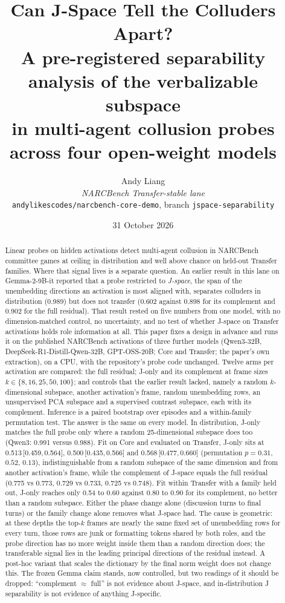 \documentclass[11pt,a4paper]{article}
\title{\textbf{Can J-Space Tell the Colluders Apart?}\\[0.3em]
\large A pre-registered separability analysis of the verbalizable subspace\\ in multi-agent collusion probes across four open-weight models}
\author{Andy Liang\\[0.4em]
{\normalsize\textit{NARCBench Transfer-stable lane}}\\[0.2em]
{\normalsize\texttt{andylikescodes/narcbench-core-demo}, branch \texttt{jspace-separability}}}
\date{31 October 2026}
\newcommand{\ci}[3]{#1\,[#2,\,#3]}
\begin{document}
\maketitle

\begin{abstract}
Linear probes on hidden activations detect multi-agent collusion in NARCBench committee games at ceiling in distribution and well above chance on held-out Transfer families. Where that signal lives is a separate question. An earlier result in this lane on Gemma-2-9B-it reported that a probe restricted to \emph{J-space}, the span of the unembedding directions an activation is most aligned with, separates colluders in distribution (0.989) but does not transfer (0.602 against 0.898 for its complement and 0.902 for the full residual). That result rested on five numbers from one model, with no dimension-matched control, no uncertainty, and no test of whether J-space on Transfer activations holds role information at all. This paper fixes a design in advance and runs it on the published NARCBench activations of three further models (Qwen3-32B, DeepSeek-R1-Distill-Qwen-32B, GPT-OSS-20B; Core and Transfer; the paper's own extraction), on a CPU, with the repository's probe code unchanged. Twelve arms per activation are compared: the full residual; J-only and its complement at frame sizes $k\in\{8,16,25,50,100\}$; and controls that the earlier result lacked, namely a random $k$-dimensional subspace, another activation's frame, random unembedding rows, an unsupervised PCA subspace and a supervised contrast subspace, each with its complement. Inference is a paired bootstrap over episodes and a within-family permutation test. The answer is the same on every model. In distribution, J-only matches the full probe only where a random 25-dimensional subspace does too (Qwen3: 0.991 versus 0.988). Fit on Core and evaluated on Transfer, J-only sits at \ci{0.513}{0.459}{0.564}, \ci{0.500}{0.435}{0.566} and \ci{0.568}{0.477}{0.660} (permutation $p=0.31$, $0.52$, $0.13$), indistinguishable from a random subspace of the same dimension and from another activation's frame, while the complement of J-space equals the full residual (0.775 vs 0.773, 0.729 vs 0.733, 0.725 vs 0.748). Fit within Transfer with a family held out, J-only reaches only 0.54 to 0.60 against 0.80 to 0.90 for its complement, no better than a random subspace. Either the phase change alone (discussion turns to final turns) or the family change alone removes what J-space had. The cause is geometric: at these depths the top-$k$ frames are nearly the same fixed set of unembedding rows for every turn, those rows are junk or formatting tokens shared by both roles, and the probe direction has no more weight inside them than a random direction does; the transferable signal lies in the leading principal directions of the residual instead. A post-hoc variant that scales the dictionary by the final norm weight does not change this. The frozen Gemma claim stands, now controlled, but two readings of it should be dropped: ``complement $\approx$ full'' is not evidence about J-space, and in-distribution J separability is not evidence of anything J-specific.
\end{abstract}
\end{document}
